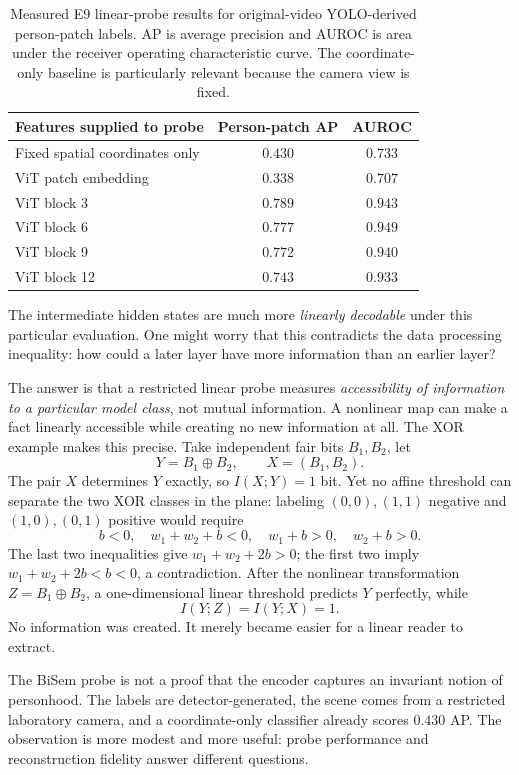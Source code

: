 \begin{table}[htbp]
\centering
\begin{tabular}{@{}lcc@{}}
\toprule
Features supplied to probe & Person-patch AP & AUROC\\
\midrule
Fixed spatial coordinates only & \(0.430\) & \(0.733\)\\
ViT patch embedding & \(0.338\) & \(0.707\)\\
ViT block 3 & \(\mathbf{0.789}\) & \(0.943\)\\
ViT block 6 & \(0.777\) & \(\mathbf{0.949}\)\\
ViT block 9 & \(0.772\) & \(0.940\)\\
ViT block 12 & \(0.743\) & \(0.933\)\\
\bottomrule
\end{tabular}
\caption{Measured E9 linear-probe results for original-video YOLO-derived person-patch labels. AP is average precision and AUROC is area under the receiver operating characteristic curve. The coordinate-only baseline is particularly relevant because the camera view is fixed.}
\label{tab:N20261009-bisem-probe}
\end{table}

The intermediate hidden states are much more \emph{linearly decodable} under this particular evaluation. One might worry that this contradicts the data processing inequality: how could a later layer have more information than an earlier layer?

The answer is that a restricted linear probe measures \emph{accessibility of information to a particular model class}, not mutual information. A nonlinear map can make a fact linearly accessible while creating no new information at all. The XOR example makes this precise. Take independent fair bits \(B_1,B_2\), let
\[
 Y=B_1\oplus B_2,\qquad X=(B_1,B_2).
\]
The pair \(X\) determines \(Y\) exactly, so \(I(X;Y)=1\) bit. Yet no affine threshold can separate the two XOR classes in the plane: labeling \((0,0),(1,1)\) negative and \((1,0),(0,1)\) positive would require
\[
 b<0,\quad w_1+w_2+b<0,\quad
 w_1+b>0,\quad w_2+b>0.
\]
The last two inequalities give \(w_1+w_2+2b>0\); the first two imply \(w_1+w_2+2b<b<0\), a contradiction. After the nonlinear transformation \(Z=B_1\oplus B_2\), a one-dimensional linear threshold predicts \(Y\) perfectly, while
\[
 I(Y;Z)=I(Y;X)=1.
\]
No information was created. It merely became easier for a linear reader to extract.

The BiSem probe is not a proof that the encoder captures an invariant notion of personhood. The labels are detector-generated, the scene comes from a restricted laboratory camera, and a coordinate-only classifier already scores \(0.430\) AP. The observation is more modest and more useful: probe performance and reconstruction fidelity answer different questions.

